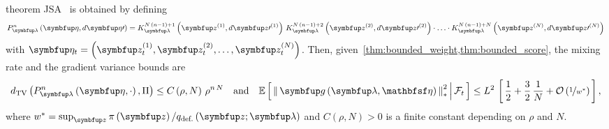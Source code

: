 
\begin{theoremEnd}{theorem}\label{thm:jsa}
  JSA~\citep{pmlr-v124-ou20a} is obtained by defining 
  {\small
  \begin{align*}
  P_{\vlambda}^n\left(\veta, d\veta\prime\right)
  = 
  K_{\vlambda}^{N\,\left(n-1\right) + 1}\left(\vz^{(1)}, d\vz\prime^{(1)}\right)
  \,
  K_{\vlambda}^{N\,\left(n-1\right) + 2}\left(\vz^{(2)}, d\vz\prime^{(2)}\right)
  \cdot
  \ldots 
  \cdot
  K_{\vlambda}^{N\,\left(n-1\right) + N}\left(\vz^{(N)}, d\vz\prime^{(N)}\right)
  \end{align*}
  }
  with \(\veta_t = \left(\vz_t^{(1)}, \vz_t^{(2)}, \ldots, \vz_t^{(N)}\right)\).
  Then, given~\cref{thm:bounded_weight,thm:bounded_score}, the mixing rate and the gradient variance bounds are
  {\small
  \begin{align*}
    \DTV{P_{\vlambda}^n\left(\veta, \cdot\right)}{\Pi}
    \leq
    C\left(\rho, N\right)\,{\rho}^{n\,N}
    \quad\text{and}\quad
    \E{ \norm{ \vg\left(\vlambda, \rvveta\right) }^2_{*} \,\middle|\, \mathcal{F}_{t} }
    \leq
    L^2 \,
    \left[\,
    \frac{1}{2} + \frac{3}{2}\,\frac{1}{N}
    + \mathcal{O}\left(\nicefrac{1}{w^*}\right)
    \,\right],
  \end{align*}
  }
  where \(w^* = \sup_{\vz} \pi\left(\vz\right) / q_{\text{def.}}\left(\vz;\vlambda\right)\) and \(C\left(\rho, N\right) > 0\) is a finite constant depending on \(\rho\) and \(N\).
\end{theoremEnd}
